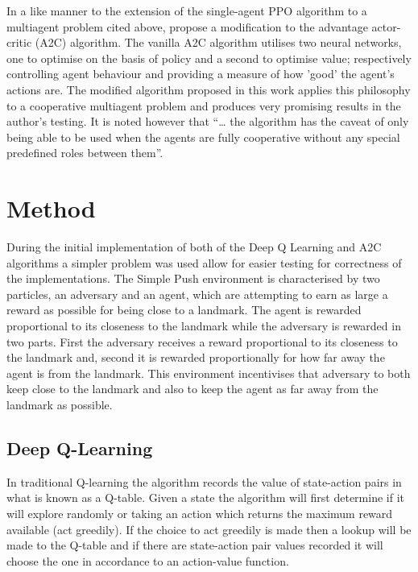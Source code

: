 \documentclass{article}
\begin{document}
In a like manner to the extension of the single-agent PPO algorithm to a multiagent problem cited above, \citet{9263738} propose a modification to the advantage actor-critic (A2C) algorithm.
The vanilla A2C algorithm utilises two neural networks, one to optimise on the basis of policy and a second to optimise value; respectively controlling agent behaviour and providing a measure of how 'good' the agent's actions are.
The modified algorithm proposed in this work applies this philosophy to a cooperative multiagent problem and produces very promising results in the author's testing.
It is noted however that “… the algorithm has the caveat of only being able to be used when the agents are fully cooperative without any special predefined roles between them”. \citet{terry2020pettingzoo}

\section{Method} \label{Method}

During the initial implementation of both of the Deep Q Learning and A2C algorithms a simpler problem was used allow for easier testing for correctness of the implementations.
The Simple Push environment is characterised by two particles, an adversary and an agent, which are attempting to earn as large a reward as possible for being close to a landmark.
The agent is rewarded proportional to its closeness to the landmark while the adversary is rewarded in two parts.
First the adversary receives a reward proportional to its closeness to the landmark and, second it is rewarded proportionally for how far away the agent is from the landmark.
This environment incentivises that adversary to both keep close to the landmark and also to keep the agent as far away from the landmark as possible.

\subsection{Deep Q-Learning} \label{DQN-Method}

In traditional Q-learning the algorithm records the value of state-action pairs in what is known as a Q-table.
Given a state the algorithm will first determine if it will explore randomly or taking an action which returns the maximum reward available (act greedily).
If the choice to act greedily is made then a lookup will be made to the Q-table and if there are state-action pair values recorded it will choose the one in accordance to an action-value function.
\end{document}
